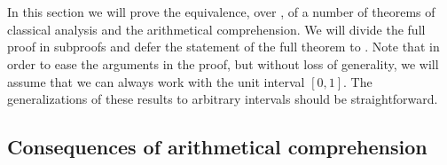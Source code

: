 \documentclass[../main.tex]{memoir}
\begin{document}
\section{\aca}

In this section we will prove the equivalence, over \rca, of a number of theorems of classical analysis and the arithmetical comprehension. We will divide the full proof in subproofs and defer the statement of the full theorem to . Note that in order to ease the arguments in the proof, but without loss of generality, we will assume that we can always work with the unit interval $[0, 1]$. The generalizations of these results to arbitrary intervals should be straightforward.

\subsection{Consequences of arithmetical comprehension}
\end{document}
